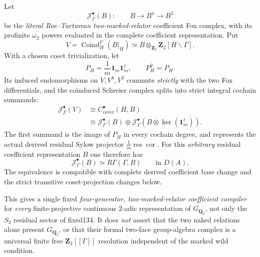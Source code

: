 \begin{theorem}
Let
\[
\mathcal J_\Gamma^\bullet(B):
\qquad
B\longrightarrow B^{4}
\longrightarrow B^2
\]
be the \emph{literal
Roe--Turturean
two-marked-relator}
coefficient Fox
complex,
with its
profinite $\omega_2$
powers evaluated
in the complete
coefficient
representation.
Put
\[
V=\operatorname{Coind}_H^\Gamma(B|_H)
\simeq B\otimes_{\mathbf Z_2}
\mathbf Z_2[H\backslash\Gamma].
\]
With a chosen
coset trivialization,
let
\begin{equation}\label{eq:dyadic-f135-odd-coset-projector}
\boxed{\quad
P_H=\frac1m\mathbf1_m\mathbf1_m^t,
\qquad
P_H^2=P_H.
\quad}
\end{equation}
Its induced
endomorphisms on
$V,V^4,V^2$
commute \emph{strictly}
with the two
Fox differentials,
and the
coinduced
Schreier complex
splits into
strict integral
cochain summands:
\begin{equation}\label{eq:dyadic-f135-uniform-coinduced-splitting}
\boxed{
\begin{aligned}
\mathcal J_\Gamma^\bullet(V)
&\cong
C_{\mathrm{cover}}^\bullet(H,B)\\
&\cong
\mathcal J_\Gamma^\bullet(B)
\oplus
\mathcal J_\Gamma^\bullet
\left(B\otimes\ker(\mathbf1_m^t)\right).
\end{aligned}}
\end{equation}
The first summand
is the image of
$P_H$ in every
cochain degree,
and represents the
actual derived
residual Sylow
projector
$\frac1m\operatorname{res}
\operatorname{cor}$.
For this \emph{arbitrary}
residual coefficient
representation
$B$ one therefore has
\begin{equation}\label{eq:dyadic-f135-universal-coefficient-rgamma}
\boxed{\qquad
\mathcal J_\Gamma^\bullet(B)
\simeq
R\Gamma(\Gamma,B)
\qquad
\text{in }D(A).
\qquad}
\end{equation}
The equivalence is
compatible with
complete derived
coefficient base
change and the
strict transitive
coset-projection
changes below.

This gives a
single fixed
\emph{four-generator,
two-marked-relator}
\emph{coefficient
compiler}
for \emph{every}
finite-projective
continuous
$2$-adic
representation
of $G_{\mathbf Q_2}$,
not only the
$S_3$ residual
sector of fixed134.
It does \emph{not}
assert that the
two naked relations
alone present
$G_{\mathbf Q_2}$,
or that their
formal two-face
group-algebra
complex is a
universal
finite free
$\mathbf Z_2[[\Gamma]]$
resolution independent
of the marked
wild condition.
\end{theorem}

